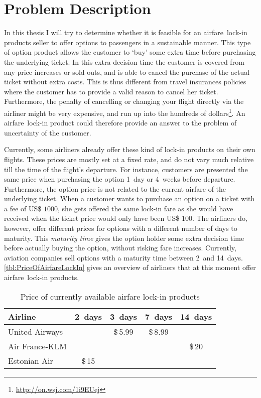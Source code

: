 \chapter{Problem Description}
\label{chap:ProblemDescription}
In this thesis I will try to determine whether it is feasible for an airfare~lock-in products seller to offer options to passengers in a sustainable manner. This type of option product allows the customer to `buy' some extra time before purchasing the underlying ticket. In this extra decision time the customer is covered from any price increases or sold-outs, and is able to cancel the purchase of the actual ticket without extra costs. This is thus different from travel insurances policies where the customer has to provide a valid reason to cancel her ticket. Furthermore, the penalty of cancelling or changing your flight directly via the airliner might be very expensive, and run up into the hundreds of dollars\footnote{\url{http://on.wsj.com/1i9EUej}}. An airfare~lock-in product could therefore provide an answer to the problem of uncertainty of the customer.

Currently, some airliners already offer these kind of lock-in products on their own flights. These prices are mostly set at a fixed rate, and do not vary much relative till the time of the flight's departure. For instance, customers are presented the same price when purchasing the option 1~day or 4~weeks before departure. Furthermore, the option price is not related to the current airfare of the underlying ticket. When a customer wants to purchase an option on a ticket with a fee of US\$ $1000$, she gets offered the same lock-in fare as she would have received when the ticket price would only have been US\$ $100$. The airliners do, however, offer different prices for options with a different number of days to maturity. This \emph{maturity time} gives the option holder some extra decision time before actually buying the option, without risking fare increases. Currently, aviation companies sell options with a maturity time between 2~and 14~days. \autoref{tbl:PriceOfAirfareLockIn} gives an overview of airliners that at this moment offer airfare~lock-in products.

\begin{table}
    \centering
    \begin{tabular}{l  c  c  c  c}
    \toprule
    Airline         & 2~days & 3~days   & 7~days   & 14~days  \\
    \midrule
    United Airways  &        & \$\,5.99 & \$\,8.99 &           \\
    Air France-KLM  &        &          &          & \$\,20    \\
    Estonian Air    & \$\,15 &          &          &           \\
    \bottomrule
    \end{tabular}
    \caption{Price of currently available airfare lock-in products}
    \label{tbl:PriceOfAirfareLockIn}
\end{table}

